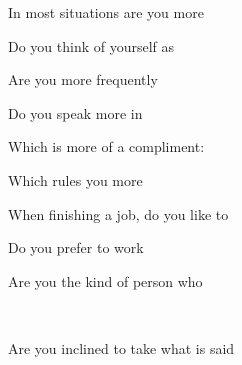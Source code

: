 \documentclass[english,pdf,pagemark,stamp,globalid=\candidateID,oneside]{sdaps}
\begin{document}
\begin{questionnaire}
\begin{multicols}{2}
\begin{choicequestion}[2]{In most situations are you more}
\end{choicequestion}

\begin{choicequestion}[2]{Do you think of yourself as}
\end{choicequestion}

\begin{choicequestion}[2]{Are you more frequently}
\end{choicequestion}

\begin{choicequestion}[2]{Do you speak more in}
\end{choicequestion}

\begin{choicequestion}[2]{Which is more of a compliment:}
\end{choicequestion}

\begin{choicequestion}[2]{Which rules you more}
\end{choicequestion}

\begin{choicequestion}[2]{When finishing a job, do you like to}
\end{choicequestion}

\begin{choicequestion}[2]{Do you prefer to work}
\end{choicequestion}

\begin{choicequestion}[2]{Are you the kind of person who}
\end{choicequestion}
\\
\begin{choicequestion}[2]{Are you inclined to take what is said}
\end{choicequestion}


\end{multicols}
\end{questionnaire}
\end{document}
